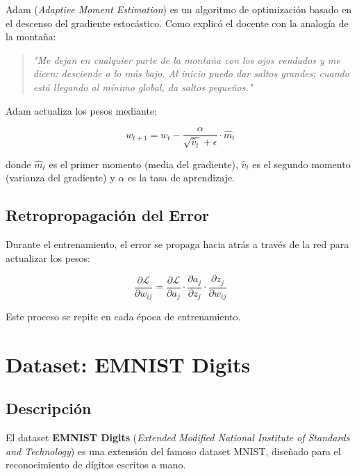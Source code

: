 \documentclass[12pt,a4paper]{article}
\begin{document}
Adam (\textit{Adaptive Moment Estimation}) es un algoritmo de optimización basado en el descenso del gradiente estocástico. Como explicó el docente con la analogía de la montaña:

\begin{quote}
\textit{"Me dejan en cualquier parte de la montaña con los ojos vendados y me dicen: desciende a lo más bajo. Al inicio puedo dar saltos grandes; cuando está llegando al mínimo global, da saltos pequeños."}
\end{quote}

Adam actualiza los pesos mediante:

\begin{equation}
    w_{t+1} = w_t - \frac{\alpha}{\sqrt{\hat{v}_t} + \epsilon} \cdot \hat{m}_t
\end{equation}

donde $\hat{m}_t$ es el primer momento (media del gradiente), $\hat{v}_t$ es el segundo momento (varianza del gradiente) y $\alpha$ es la tasa de aprendizaje.

\subsection{Retropropagación del Error}

Durante el entrenamiento, el error se propaga hacia atrás a través de la red para actualizar los pesos:

\begin{equation}
    \frac{\partial \mathcal{L}}{\partial w_{ij}} = \frac{\partial \mathcal{L}}{\partial a_j} \cdot \frac{\partial a_j}{\partial z_j} \cdot \frac{\partial z_j}{\partial w_{ij}}
\end{equation}

Este proceso se repite en cada época de entrenamiento.

\section{Dataset: EMNIST Digits}

\subsection{Descripción}

El dataset \textbf{EMNIST Digits} (\textit{Extended Modified National Institute of Standards and Technology}) es una extensión del famoso dataset MNIST, diseñado para el reconocimiento de dígitos escritos a mano.
\end{document}
